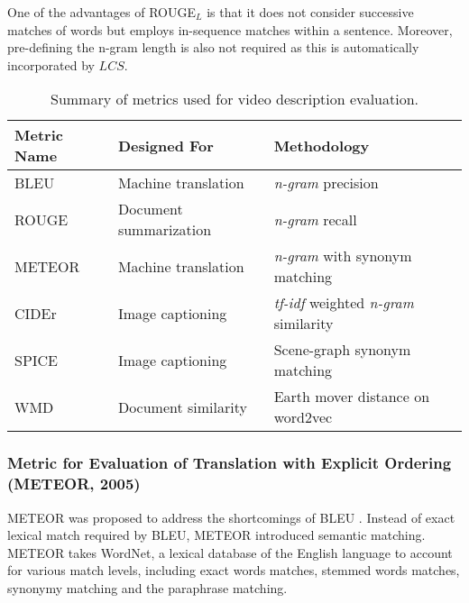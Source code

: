 \documentclass[10pt,journal,compsoc]{IEEEtran}
\begin{document}
One of the advantages of ROUGE$_L$ is that it does not consider successive matches of words but employs in-sequence matches within a sentence. Moreover, pre-defining the n-gram length is also not required as this is automatically incorporated by $LCS$. 

\begin{table*}[htbp]
  \centering
  \small
   \setlength{\tabcolsep}{5.0pt}       %
   \renewcommand{\arraystretch}{1.20}  %
   \setlength{\belowcaptionskip}{-10pt}
   \caption{Summary of metrics used for video description evaluation.}
  \vspace{-4mm}
  \begin{tabular}{lll}
    \hline
    Metric Name & Designed For & Methodology \\
    \hline
    BLEU~\cite{papineni2002bleu}   & Machine translation    & \textit{n-gram} precision\\
    ROUGE~\cite{lin2004rouge}      & Document summarization & \textit{n-gram} recall \\
    METEOR~\cite{lavie2005meteor}  & Machine translation    & \textit{n-gram} with synonym matching \\
    CIDEr~\cite{vedantam2015cider} & Image captioning       & \textit{tf-idf} weighted \textit{n-gram} similarity \\
    SPICE~\cite{anderson2016spice} & Image captioning       & Scene-graph synonym matching\\
    WMD~\cite{kusner2015word}   & Document similarity    & Earth mover distance on word2vec\\
    \hline
    \end{tabular}%
  \label{tab:evalmetrics}%
\vspace{-3mm}
\end{table*}

\subsubsection{Metric for Evaluation of Translation with Explicit Ordering (METEOR, 2005)}
METEOR \cite{lavie2005meteor} was proposed to address the shortcomings of BLEU \cite{papineni2002bleu}. Instead of exact lexical match required by BLEU, METEOR introduced semantic matching. METEOR takes WordNet\cite{fellbaum1998wordnet}, a lexical database of the English language to account for various match levels, including exact words matches, stemmed words matches, synonymy matching and the paraphrase matching. 
\end{document}
